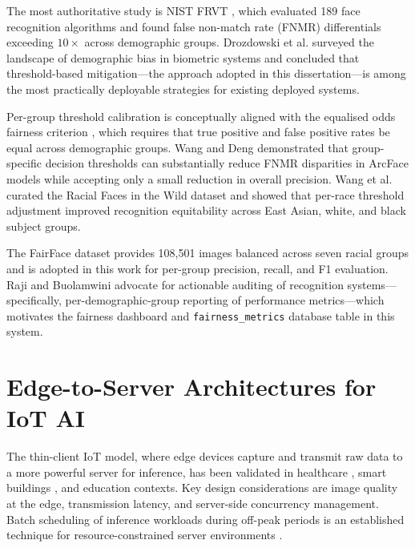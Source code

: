 \documentclass[12pt,a4paper]{report}
\begin{document}
The most authoritative study is NIST FRVT \cite{grother2019frvt}, which evaluated 189 face recognition algorithms and found false non-match rate (FNMR) differentials exceeding $10\times$ across demographic groups. Drozdowski et al. \cite{drozdowski2020demographic} surveyed the landscape of demographic bias in biometric systems and concluded that threshold-based mitigation—the approach adopted in this dissertation—is among the most practically deployable strategies for existing deployed systems.

Per-group threshold calibration is conceptually aligned with the equalised odds fairness criterion \cite{hardt2016equality}, which requires that true positive and false positive rates be equal across demographic groups. Wang and Deng \cite{wang2020mitigating} demonstrated that group-specific decision thresholds can substantially reduce FNMR disparities in ArcFace models while accepting only a small reduction in overall precision. Wang et al. \cite{wang2019racial} curated the Racial Faces in the Wild dataset and showed that per-race threshold adjustment improved recognition equitability across East Asian, white, and black subject groups.

The FairFace dataset \cite{karkkainen2021fairface} provides 108,501 images balanced across seven racial groups and is adopted in this work for per-group precision, recall, and F1 evaluation. Raji and Buolamwini \cite{raji2019actionable} advocate for actionable auditing of recognition systems—specifically, per-demographic-group reporting of performance metrics—which motivates the fairness dashboard and \texttt{fairness\_metrics} database table in this system.

\section{Edge-to-Server Architectures for IoT AI}
The thin-client IoT model, where edge devices capture and transmit raw data to a more powerful server for inference, has been validated in healthcare \cite{li2020iot}, smart buildings \cite{chen2019iot}, and education \cite{rahman2020iot} contexts. Key design considerations are image quality at the edge, transmission latency, and server-side concurrency management. Batch scheduling of inference workloads during off-peak periods is an established technique for resource-constrained server environments \cite{zhang2019batch}.
\end{document}
